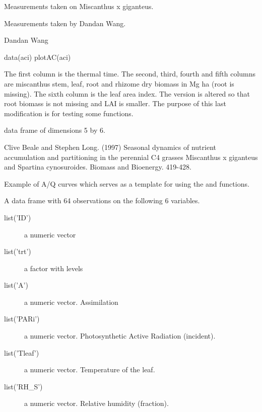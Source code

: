 \documentclass[letterpaper]{book}
\begin{document}
%
\begin{Details}\relax
Measurements taken on Miscanthus x giganteus.
\end{Details}
%
\begin{Source}\relax
Measurements taken by Dandan Wang.
\end{Source}
%
\begin{References}\relax
Dandan Wang
\end{References}
%
\begin{Examples}
\begin{ExampleCode}
data(aci)
plotAC(aci)
\end{ExampleCode}
\end{Examples}
%
\begin{Description}\relax
The first column is the thermal time. The second, third,
fourth and fifth columns are miscanthus stem, leaf, root
and rhizome dry biomass in Mg ha (root is
missing). The sixth column is the leaf area index. The
 version is altered so that root biomass
is not missing and LAI is smaller. The purpose of this last
modification is for testing some functions.
\end{Description}
%
\begin{Format}
data frame of dimensions 5 by 6.
\end{Format}
%
\begin{Source}\relax
Clive Beale and Stephen Long. (1997) Seasonal dynamics of
nutrient accumulation and partitioning in the perennial C4
grasses Miscanthus x giganteus and Spartina cynosuroides.
Biomass and Bioenergy. 419-428.
\end{Source}
%
\begin{Description}\relax
Example of A/Q curves which serves as a template for using
the  and 
functions.
\end{Description}
%
\begin{Format}
A data frame with 64 observations on the following 6 variables.
\begin{description}
 \item[list('ID')] a numeric vector\item[list('trt')] a factor
with levels  \item[list('A')] a numeric vector.
Assimilation\item[list('PARi')] a numeric vector. Photosynthetic Active
Radiation (incident).\item[list('Tleaf')] a numeric vector. Temperature
of the leaf.\item[list('RH\_S')] a numeric vector. Relative humidity
(fraction).
\end{description}
\end{Format}
\end{document}
